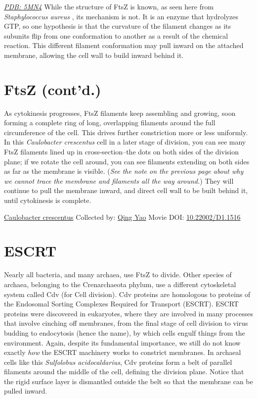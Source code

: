 \documentclass[]{tufte-book}
\begin{document}
\href{http://rcsb.org/structure/5MN4}{\emph{PDB: 5MN4}}
While the structure of FtsZ is known, as seen here from \emph{Staphylococcus aureus} \citep{wagstaff2017}, its mechanism is not. It is an enzyme that hydrolyzes GTP, so one hypothesis is that the curvature of the filament changes as its subunits flip from one conformation to another as a result of the chemical reaction. This different filament conformation may pull inward on the attached membrane, allowing the cell wall to build inward behind it.

\hypertarget{ftsz-contd.}{%
\section{FtsZ (cont'd.)}\label{ftsz-contd.}}

As cytokinesis progresses, FtsZ filaments keep assembling and growing, soon forming a complete ring of long, overlapping filaments around the full circumference of the cell. This drives further constriction more or less uniformly. In this \emph{Caulobacter crescentus} cell in a later stage of division, you can see many FtsZ filaments lined up in cross-section--the dots on both sides of the division plane; if we rotate the cell around, you can see filaments extending on both sides as far as the membrane is visible. (\emph{See the note on the previous page about why we cannot trace the membrane and filaments all the way around.}) They will continue to pull the membrane inward, and direct cell wall to be built behind it, until cytokinesis is complete.



\hypertarget{htmlwidget-0e0e36760fea1ab19bc7}{}

\label{fig:5-10}\protect\hyperlink{tree}{Caulobacter crescentus} Collected by: \protect\hyperlink{qing_yao}{Qing Yao} Movie DOI: \href{https://doi.org/10.22002/D1.1516}{10.22002/D1.1516}

\hypertarget{escrt}{%
\section{ESCRT}\label{escrt}}

Nearly all bacteria, and many archaea, use FtsZ to divide. Other species of archaea, belonging to the Crenarchaeota phylum, use a different cytoskeletal system called Cdv (for Cell division). Cdv proteins are homologous to proteins of the Endosomal Sorting Complexes Required for Transport (ESCRT). ESCRT proteins were discovered in eukaryotes, where they are involved in many processes that involve cinching off membranes, from the final stage of cell division to virus budding to endocytosis (hence the name), by which cells engulf things from the environment. Again, despite its fundamental importance, we still do not know exactly \emph{how} the ESCRT machinery works to constrict membranes. In archaeal cells like this \emph{Sulfolobus acidocaldarius}, Cdv proteins form a belt of parallel filaments around the middle of the cell, defining the division plane. Notice that the rigid surface layer is dismantled outside the belt so that the membrane can be pulled inward.
\end{document}
